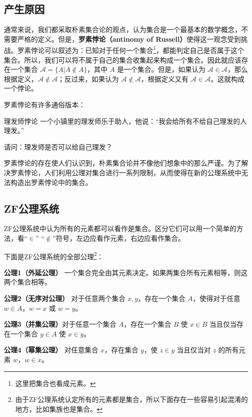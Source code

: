 \begin{issues}
\issueTODO
\end{issues}

\subsection{产生原因}
通常来说，我们都采取朴素集合论的观点，认为集合是一个最基本的数学概念，不需要严格的定义。但是，\textbf{罗素悖论（antinomy of Russell）}使得这一观念受到挑战。罗素悖论可以叙述为：已知对于任何一个集合\footnote{这里把集合也看成元素。}，都能判定自己是否属于这个集合。所以，我们可以将不属于自己的集合收集起来构成一个集合。因此就应该存在一个集合 $\mathcal{A}=\{A|A\notin A\}$，其中 $A$ 是一个集合。但是，如果认为 $\mathcal{A}\in\mathcal{A}$，那么根据定义，$\mathcal{A}\notin\mathcal{A}$；反过来，如果认为 $\mathcal{A}\notin\mathcal{A}$，根据定义又有 $\mathcal{A}\in\mathcal{A}$。这就构成一个悖论。

罗素悖论有许多通俗版本：
\begin{example}{理发师悖论}
一个小镇里的理发师乐于助人，他说：“我会给所有不给自己理发的人理发。”

请问：理发师是否可以给自己理发？
\end{example}

罗素悖论的存在使人们认识到，朴素集合论并不像他们想象中的那么严谨。为了解决罗素悖论，人们利用公理对集合进行一系列限制，从而使得在新的公理系统中无法构造出罗素悖论中的集合。

\subsection{ZF公理系统}
ZF公理系统中认为所有的元素都可以看作是集合。区分它们可以用一个简单的方法，看“$\in$” “$\notin$”符号，左边应看作元素，右边应看作集合。

下面是ZF公理系统的全部公理\footnote{由于ZF公理系统认定所有的元素都是集合，所以下面存在一些容易引起混淆的地方，比如集族也是集合。}：

\textbf{公理1（外延公理）} 一个集合完全由其元素决定。如果两集合所有元素相等，则这两个集合相等。

\textbf{公理2（无序对公理）} 对于任意两个集合 $x,y$，存在一个集合 $A$，使得对于任意 $w\in A$，$w=x$ 或 $w=y$。

\textbf{公理3（并集公理）}对于任意一个集合 $A$，存在一个集合 $B$ 使 $x\in B$ 当且仅当存在一个集合 $y\in A$ 使 $x\in y$。

\textbf{公理4（幂集公理）} 对任意集合 $x$，存在集合 $y$，使 $z\in y$ 当且仅当对 $z$ 的所有元素 $w$，$w\in x$。

